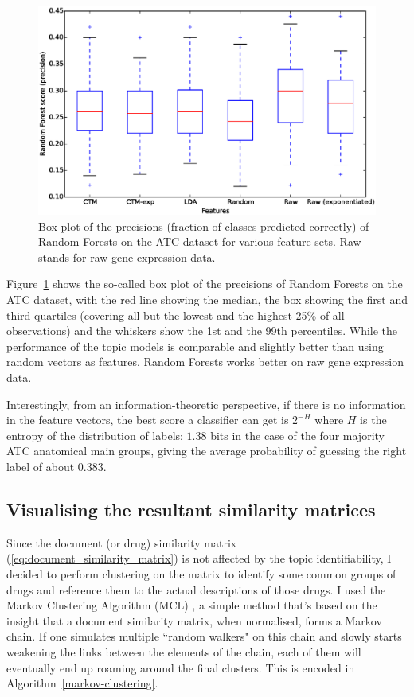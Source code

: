 \documentclass[12pt,a4paper,twoside,openright]{report}
\begin{document}
\begin{figure}[!htb]
\includegraphics[width=\textwidth]{atc-boxplot.eps}
\caption{Box plot of the precisions (fraction of classes predicted correctly) of Random Forests on the ATC dataset for various feature sets. Raw stands for raw gene expression data.}
\label{fig:atc-boxplot}
\end{figure}

Figure~\ref{fig:atc-boxplot} shows the so-called box plot of the precisions of Random Forests on the ATC dataset, with the red line showing the median, the box showing the first and third quartiles (covering all but the lowest and the highest 25\% of all observations) and the whiskers show the 1st and the 99th percentiles. While the performance of the topic models is comparable and slightly better than using random vectors as features, Random Forests works better on raw gene expression data.

Interestingly, from an information-theoretic perspective, if there is no information in the feature vectors, the best score a classifier can get is $2^{-H}$ where $H$ is the entropy of the distribution of labels: $1.38$ bits in the case of the four majority ATC anatomical main groups, giving the average probability of guessing the right label of about $0.383$.

\subsection{Visualising the resultant similarity matrices}
Since the document (or drug) similarity matrix (\ref{eq:document_similarity_matrix}) is not affected by the topic identifiability, I decided to perform clustering on the matrix to identify some common groups of drugs and reference them to the actual descriptions of those drugs.
I used the Markov Clustering Algorithm (MCL)  \cite{Dongen:2000:CAG:868986}, a simple method that's based on the insight that a document similarity matrix, when normalised, forms a Markov chain. If one simulates multiple ``random walkers" on this chain and slowly starts weakening the links between the elements of the chain, each of them will eventually end up roaming around the final clusters. This is encoded in Algorithm~\ref{markov-clustering}.
\end{document}
